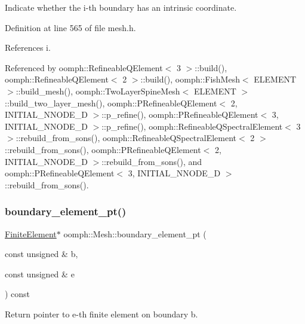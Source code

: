 Indicate whether the i-\/th boundary has an intrinsic coordinate. 



Definition at line 565 of file mesh.\+h.



References i.



Referenced by oomph\+::\+Refineable\+Q\+Element$<$ 3 $>$\+::build(), oomph\+::\+Refineable\+Q\+Element$<$ 2 $>$\+::build(), oomph\+::\+Fish\+Mesh$<$ E\+L\+E\+M\+E\+N\+T $>$\+::build\+\_\+mesh(), oomph\+::\+Two\+Layer\+Spine\+Mesh$<$ E\+L\+E\+M\+E\+N\+T $>$\+::build\+\_\+two\+\_\+layer\+\_\+mesh(), oomph\+::\+P\+Refineable\+Q\+Element$<$ 2, I\+N\+I\+T\+I\+A\+L\+\_\+\+N\+N\+O\+D\+E\+\_\+D $>$\+::p\+\_\+refine(), oomph\+::\+P\+Refineable\+Q\+Element$<$ 3, I\+N\+I\+T\+I\+A\+L\+\_\+\+N\+N\+O\+D\+E\+\_\+D $>$\+::p\+\_\+refine(), oomph\+::\+Refineable\+Q\+Spectral\+Element$<$ 3 $>$\+::rebuild\+\_\+from\+\_\+sons(), oomph\+::\+Refineable\+Q\+Spectral\+Element$<$ 2 $>$\+::rebuild\+\_\+from\+\_\+sons(), oomph\+::\+P\+Refineable\+Q\+Element$<$ 2, I\+N\+I\+T\+I\+A\+L\+\_\+\+N\+N\+O\+D\+E\+\_\+D $>$\+::rebuild\+\_\+from\+\_\+sons(), and oomph\+::\+P\+Refineable\+Q\+Element$<$ 3, I\+N\+I\+T\+I\+A\+L\+\_\+\+N\+N\+O\+D\+E\+\_\+D $>$\+::rebuild\+\_\+from\+\_\+sons().

\mbox{\label{classoomph_1_1Mesh_a875271b6f162ddc5685a2511b35e75ec}} 
\subsubsection{\texorpdfstring{boundary\+\_\+element\+\_\+pt()}{boundary\_element\_pt()}}
{\footnotesize\ttfamily \hyperlink{classoomph_1_1FiniteElement}{Finite\+Element}$\ast$ oomph\+::\+Mesh\+::boundary\+\_\+element\+\_\+pt (\begin{DoxyParamCaption}\item[{const unsigned \&}]{b,  }\item[{const unsigned \&}]{e }\end{DoxyParamCaption}) const\hspace{0.3cm}{\ttfamily [inline]}}



Return pointer to e-\/th finite element on boundary b. 



